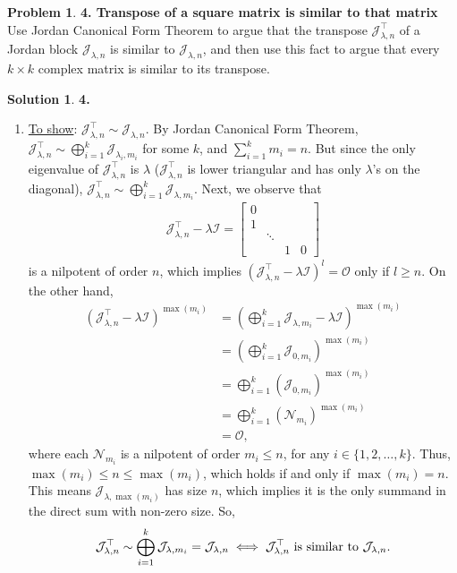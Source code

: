 \documentclass{article}
\theoremstyle{definition}
\newtheorem*{prob*}{Problem}
\newtheorem*{sln*}{Solution}
\newcommand{\N}{\mathcal{N}}
\newcommand{\jor}{\mathcal{J}}
\begin{document}
\begin{prob*}\textbf{4. Transpose of a square matrix is similar to that matrix} \\
	Use Jordan Canonical Form Theorem to argue that the transpose $\mathcal{J}^\top_{\lambda,n}$ of a Jordan block $\jor_{\lambda,n}$ is similar to $\jor_{\lambda,n}$, and then use this fact to argue that every $k\times k$ complex matrix is similar to its transpose.\\
	
	\begin{sln*}\textbf{4. }
		
		\begin{enumerate}
			\item \underline{To show}: $ \jor^\top_{\lambda,n} \sim  \jor_{\lambda, n} $. By Jordan Canonical Form Theorem, $\mathcal{J}^\top_{\lambda,n} \sim \bigoplus^k_{i=1} \jor_{\lambda_i, m_i}$ for some $k$, and $\sum^k_{i=1}m_i = n$. But since the only eigenvalue of $\jor^\top_{\lambda,n}$ is $\lambda$ ($\jor^\top_{\lambda,n}$ is lower triangular and has only $\lambda$'s on the diagonal), $\jor^\top_{\lambda,n} \sim \bigoplus^k_{i=1}\jor_{\lambda,m_i}$. Next, we observe that 
		\begin{align*}
		\jor^\top_{\lambda,n} - \lambda \mathcal{I} = \begin{bmatrix}
		0 && &  \\
		1 &  && \\
		&\ddots & \\
		&   &1& 0  
		\end{bmatrix}
		\end{align*} 
		is a nilpotent of order $n$, which implies $(\jor^\top_{\lambda,n} - \lambda \mathcal{I})^l = \mathcal{O}$ only if $l \geq n$. On the other hand,
		\begin{align*}
		(\jor^\top_{\lambda,n} - \lambda \mathcal{I})^{\max(m_i)}
		&=\left(\bigoplus^k_{i=1}\jor_{\lambda,m_i} - \lambda\mathcal{I}\right)^{\max(m_i)}\\ 
		&= \left(\bigoplus^k_{i=1}\jor_{0,m_i}\right)^{\max(m_i)}\\
		&=\bigoplus^k_{i=1} \left(\jor_{0,m_i}\right)^{\max(m_i)}\\
		&= \bigoplus^k_{i=1}\left(\N_{m_i}\right)^{\max(m_i)} \\
		&= \mathcal{O},
		\end{align*}
		where each $\N_{m_i}$ is a nilpotent of order $m_i \leq n$, for any $i \in \{1,2,\dots,k\}$. Thus, $\max(m_i) \leq n \leq \max(m_i)$, which holds if and only if $\max(m_i) = n$. This means $\jor_{\lambda, \max(m_i)}$ has size $n$, which implies it is the only summand in the direct sum with non-zero size. So, 
		\begin{align*}
		\jor^\top_{\lambda,n} \sim \bigoplus^k_{i=1} \jor_{\lambda, m_i} = \jor_{\lambda, n}\iff \text{$\jor^\top_{\lambda,n}$ is similar to $ \jor_{\lambda, n}$.}
		\end{align*}
		

\end{enumerate}
\end{sln*}
\end{prob*}
\end{document}
